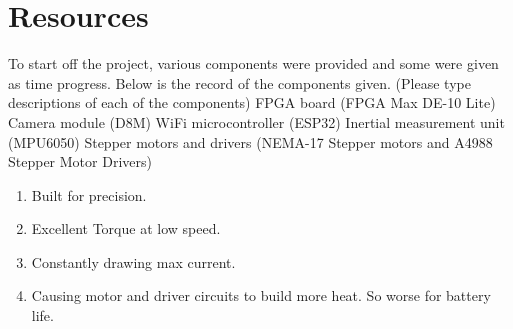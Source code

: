 \section{Resources}
To start off the project, various components were provided and some were given as time progress. Below is the record of the components given. (Please type descriptions of each of the components)
FPGA board (FPGA Max DE-10 Lite)
Camera module (D8M)
WiFi microcontroller (ESP32)
Inertial measurement unit (MPU6050)
Stepper motors and drivers (NEMA-17 Stepper motors and A4988 Stepper Motor Drivers)
\begin{enumerate}[label=--]
    \item Built for precision.
    \item Excellent Torque at low speed.
    \item Constantly drawing max current.
    \item Causing motor and driver circuits to build more heat. So worse for battery life.

\end{enumerate}